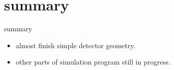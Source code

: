 \documentclass[11pt,compress,xcolor=x11names,UTF8]{beamer}
\begin{document}
\section{summary}

\begin{frame}{summary}
\begin{itemize}
\item  almost finish simple detector geometry.
\item  other parts of simulation program still in progress.
\end{itemize}
\end{frame}


\begin{frame}
\end{frame}

%
%
\end{document}
